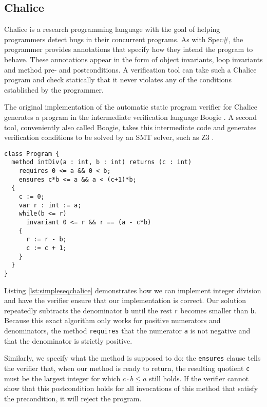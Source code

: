 
\subsection{Chalice}
Chalice is a research programming language with the goal of helping programmers detect bugs in their concurrent programs. As with Spec\#, the programmer provides annotations that specify how they intend the program to behave.
These annotations appear in the form of object invariants, loop invariants and method pre- and postconditions.
A verification tool can take such a Chalice program and check statically that it never violates any of the conditions established by the programmer.

The original implementation of the automatic static program verifier for Chalice generates a program in the intermediate verification language Boogie \cite{ByECD+06}.
A second tool, conveniently also called Boogie, takes this intermediate code and generates verification conditions to be solved by an SMT solver, such as Z3 \cite{dMB08}.

\begin{lstlisting}[language=Chalice,float,caption={Loop invariants, pre- and post conditions in a Chalice program},label=lst:simpleseqchalice]
class Program {
  method intDiv(a : int, b : int) returns (c : int)
    requires 0 <= a && 0 < b;
    ensures c*b <= a && a < (c+1)*b;
  {
    c := 0;
    var r : int := a;
    while(b <= r)
      invariant 0 <= r && r == (a - c*b)
    {
      r := r - b;
      c := c + 1;
    }
  }
}
\end{lstlisting}

Listing \ref{lst:simpleseqchalice} demonstrates how we can implement integer division and have the verifier ensure that our implementation is correct.
Our solution repeatedly subtracts the denominator \lstinline!b! until the rest \lstinline!r! becomes smaller than \lstinline!b!. 
Because this exact algorithm only works for positive numerators and denominators, the method \lstinline[language=chalice]!requires! that the numerator \lstinline!a! is not negative and that the denominator is strictly positive.

Similarly, we specify what the method is supposed to do: the \lstinline[language=Chalice]!ensures! clause tells the verifier that, when our method is ready to return, the resulting quotient \lstinline!c! must be the largest integer for which $c \cdot b \leq a$ still holds.
If the verifier cannot show that this postcondition holds for all invocations of this method that satisfy the precondition, it will reject the program.

